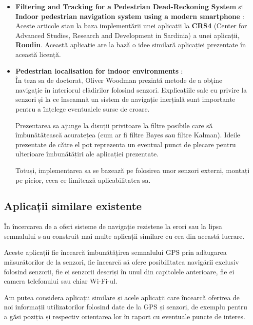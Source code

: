\documentclass[12pt, a4paper, oneside]{article}
\begin{document}
\begin{itemize}
\item \textbf{Filtering and Tracking for a Pedestrian Dead-Reckoning System} \cite{SDCPA10b} și \textbf{Indoor pedestrian navigation system using a modern smartphone} \cite{SCM10}:\\
Aceste articole stau la baza implementării unei aplicații la \textbf{CRS4} (Center for Advanced Studies, Research and Development in Sardinia) a unei aplicații, \textbf{Roodin}. Această aplicație are la bază o idee similară aplicației prezentate în această licență.

\item \textbf{Pedestrian localisation for indoor environments} \cite{OliverWoodman}:\\
În teza sa de doctorat, Oliver Woodman prezintă metode de a obține navigație în interiorul clădirilor folosind senzori. Explicațiile sale cu privire la senzori și la ce înseamnă un sistem de navigație inerțială sunt importante pentru a înțelege eventualele surse de eroare.

Prezentarea sa ajunge la disuții privitoare la filtre posibile care să îmbunătățească acuratețea (cum ar fi filtre Bayes sau filtre Kalman). Ideile prezentate de către el pot reprezenta un eventual punct de plecare pentru ulterioare îmbunătățiri ale aplicației prezentate.

Totuși, implementarea sa se bazează pe folosirea unor senzori externi, montați pe picior, ceea ce limitează aplicabilitatea sa.

\end{itemize}


\subsection{Aplicații similare existente}
În încercarea de a oferi sisteme de navigație rezistene la erori sau la lipsa semnalului s-au construit mai multe aplicații similare cu cea din această lucrare.

Aceste aplicații fie încearcă îmbunătățirea semnalului GPS prin adăugarea măsurătorilor de la senzori, fie încearcă să ofere posibilitatea navigării exclusiv folosind senzorii, fie ei senzorii descriși în unul din capitolele anterioare, fie ei camera telefonului sau chiar Wi-Fi-ul.

Am putea considera aplicații similare și acele aplicații care încearcă oferirea de noi informații utilizatorilor folosind date de la GPS și senzori, de exemplu pentru a găsi poziția și respectiv orientarea lor în raport cu eventuale puncte de interes.
\end{document}
